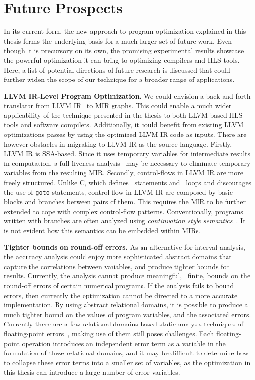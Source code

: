 \section{Future Prospects}
\label{sec:future_prospects}

In its current form, the new approach to program optimization explained in this
thesis forms the underlying basis for a much larger set of future work.  Even
though it is precursory on its own, the promising experimental results showcase
the powerful optimization it can bring to optimizing compilers and HLS tools.
Here, a list of potential directions of future research is discussed that could
further widen the scope of our technique for a broader range of applications.

\textbf{LLVM IR-Level Program Optimization.}  We could envision a
back-and-forth translator from LLVM IR~\cite{llvm, llvm_ir} to MIR graphs.
This could enable a much wider applicability of the technique presented in the
thesis to both LLVM-based HLS tools and software compilers.  Additionally,
it could benefit from existing LLVM optimizations passes by using the
optimized LLVM IR code as inputs.  There are however obstacles in migrating
to LLVM IR as the source language.  Firstly, LLVM IR is SSA-based.  Since
it uses temporary variables for intermediate results in computation, a full
liveness analysis~\cite{hathhorn12, nielson99, boissinot08} may be necessary
to eliminate temporary variables from the resulting MIR\@.  Secondly,
control-flows in LLVM IR are more freely structured.  Unlike C, which
defines \iflit~statements and \whilelit~loops and discourages the use of
\verb|goto| statements, control-flow in LLVM IR are composed by basic blocks
and branches between pairs of them.  This requires the MIR to be further
extended to cope with complex control-flow patterns.  Conventionally, programs
written with branches are often analyzed using \emph{continuation style
semantics}~\cite{felleisen88}.  It is not evident how this semantics can be
embedded within MIRs.

\textbf{Tighter bounds on round-off errors.} As an alternative for interval
analysis, the accuracy analysis could enjoy more sophisticated abstract domains
that capture the correlations between variables, and produce tighter bounds
for results.  Currently, the analysis cannot produce meaningful, \ie~finite,
bounds on the round-off errors of certain numerical programs.  If the analysis
fails to bound errors, then currently the optimization cannot be directed to
a more accurate implementation.  By using abstract relational domains, it is
possible to produce a much tighter bound on the values of program variables,
and the associated errors.  Currently there are a few relational domains-based
static analysis techniques of floating-point errors~\cite{mine07_2, goubault01,
putot04, goubault06, goubault11}, making use of them still poses challenges.
Each floating-point operation introduces an independent error term as a
variable in the formulation of these relational domains, and it may be
difficult to determine how to collapse these error terms into a smaller set of
variables, as the optimization in this thesis can introduce a large number of
error variables.


